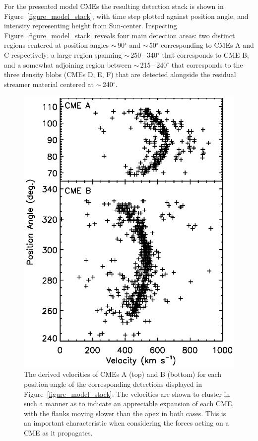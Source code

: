 \documentclass[preprint2]{aastex}
\begin{document}
For the presented model CMEs the resulting detection stack is shown in Figure~\ref{figure_model_stack}, with time step plotted against position angle, and intensity representing height from Sun-center. Inspecting Figure~\ref{figure_model_stack} reveals four main detection areas: two distinct regions centered at position angles $\sim$\,90$^{\circ}$ and $\sim$\,50$^{\circ}$ corresponding to CMEs A and C respectively; a large region spanning $\sim$\,250\,--\,340$^{\circ}$ that corresponds to CME B; and a somewhat adjoining region between $\sim$\,215\,--\,240$^{\circ}$ that corresponds to the three density blobs (CMEs D, E, F) that are detected alongside the residual streamer material centered at $\sim$\,240$^{\circ}$. 

\begin{figure}[!t]
\centerline{\includegraphics[scale=0.65, clip=true, trim=0 0 0 0]{images/figure_model_vel_angles_CMEsAB.eps}}
\caption{The derived velocities of CMEs A (top) and B (bottom) for each position angle of the corresponding detections displayed in Figure~\ref{figure_model_stack}. The velocities are shown to cluster in such a manner as to indicate an appreciable expansion of each CME, with the flanks moving slower than the apex in both cases. This is an important characteristic when considering the forces acting on a CME as it propagates.}
\label{figure_model_vel_angles_CMEsAB}
\end{figure}
\end{document}
